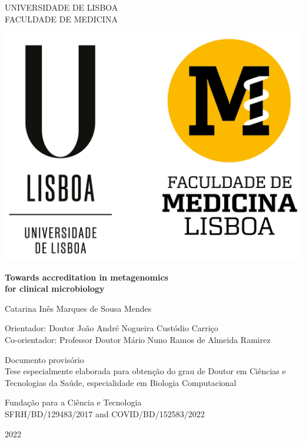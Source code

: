 \begin{titlepage}
    \begin{center}
        UNIVERSIDADE DE LISBOA\\
        FACULDADE DE MEDICINA
        
        \vspace{1cm}
        
        {\includegraphics{figures/cover/UL+FMUL-VerticalPositivo.png}}
        
        \vspace{1cm}

        \huge
        \textbf{Towards accreditation in metagenomics \\[1ex] for clinical microbiology}
        \normalsize
        
        \vspace{0.8cm}
        
        \large
        Catarina Inês Marques de Sousa Mendes
        \normalsize
        
        \vspace{0.8cm}
        
        Orientador: Doutor João André Nogueira Custódio Carriço\\
        Co-orientador: Professor Doutor Mário Nuno Ramos de Almeida Ramirez
        
        \vspace{0.8cm}
        
        Documento provisório\\
        Tese especialmente elaborada para obtenção do grau de Doutor em Ciências e Tecnologias da Saúde, especialidade em Biologia Computacional\\
        
        \vspace{0.5cm}
        
        Fundação para a Ciência e Tecnologia \\ 
        SFRH/BD/129483/2017 and COVID/BD/152583/2022
        
        \vspace{0.2cm}
        
        2022
    \end{center}
\end{titlepage}
